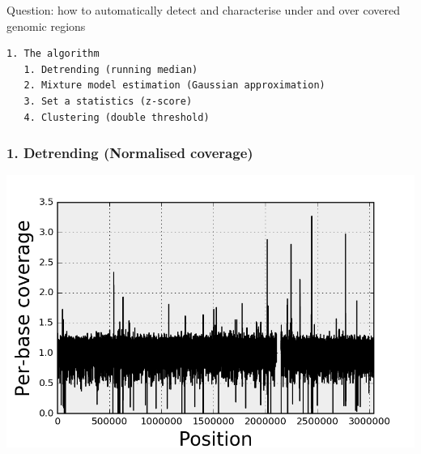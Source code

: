 \documentclass{beamer}
\begin{document}
\begin{frame}
\LARGE
\begin{block}{Question: how to automatically detect and characterise under and 
over covered genomic regions}
\end{block}

\end{frame}


\begin{frame}[fragile]
 \begin{verbatim}
1. The algorithm
   1. Detrending (running median)
   2. Mixture model estimation (Gaussian approximation)
   3. Set a statistics (z-score)
   4. Clustering (double threshold)

\end{verbatim}
\end{frame}


\begin{frame}
\frametitle{1. Detrending (Normalised coverage)}
\begin{center}
\includegraphics[height=0.8\textheight, 
    width=1\textwidth]{images/coverage_normalised.png}
\end{center} 
\end{frame}
\end{document}
